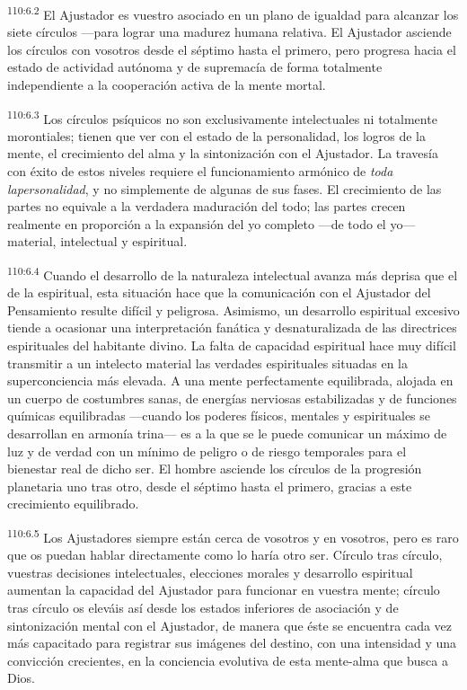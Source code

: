 \par
\textsuperscript{110:6.2} El Ajustador es vuestro asociado en un plano de igualdad para alcanzar los siete círculos ---para lograr una madurez humana relativa. El Ajustador asciende los círculos con vosotros desde el séptimo hasta el primero, pero progresa hacia el estado de actividad autónoma y de supremacía de forma totalmente independiente a la cooperación activa de la mente mortal.

\par
\textsuperscript{110:6.3} Los círculos psíquicos no son exclusivamente intelectuales ni totalmente morontiales; tienen que ver con el estado de la personalidad, los logros de la mente, el crecimiento del alma y la sintonización con el Ajustador. La travesía con éxito de estos niveles requiere el funcionamiento armónico de \textit{toda lapersonalidad}, y no simplemente de algunas de sus fases. El crecimiento de las partes no equivale a la verdadera maduración del todo; las partes crecen realmente en proporción a la expansión del yo completo ---de todo el yo--- material, intelectual y espiritual.

\par
\textsuperscript{110:6.4} Cuando el desarrollo de la naturaleza intelectual avanza más deprisa que el de la espiritual, esta situación hace que la comunicación con el Ajustador del Pensamiento resulte difícil y peligrosa. Asimismo, un desarrollo espiritual excesivo tiende a ocasionar una interpretación fanática y desnaturalizada de las directrices espirituales del habitante divino. La falta de capacidad espiritual hace muy difícil transmitir a un intelecto material las verdades espirituales situadas en la superconciencia más elevada. A una mente perfectamente equilibrada, alojada en un cuerpo de costumbres sanas, de energías nerviosas estabilizadas y de funciones químicas equilibradas ---cuando los poderes físicos, mentales y espirituales se desarrollan en armonía trina--- es a la que se le puede comunicar un máximo de luz y de verdad con un mínimo de peligro o de riesgo temporales para el bienestar real de dicho ser. El hombre asciende los círculos de la progresión planetaria uno tras otro, desde el séptimo hasta el primero, gracias a este crecimiento equilibrado.

\par
\textsuperscript{110:6.5} Los Ajustadores siempre están cerca de vosotros y en vosotros, pero es raro que os puedan hablar directamente como lo haría otro ser. Círculo tras círculo, vuestras decisiones intelectuales, elecciones morales y desarrollo espiritual aumentan la capacidad del Ajustador para funcionar en vuestra mente; círculo tras círculo os eleváis así desde los estados inferiores de asociación y de sintonización mental con el Ajustador, de manera que éste se encuentra cada vez más capacitado para registrar sus imágenes del destino, con una intensidad y una convicción crecientes, en la conciencia evolutiva de esta mente-alma que busca a Dios.

